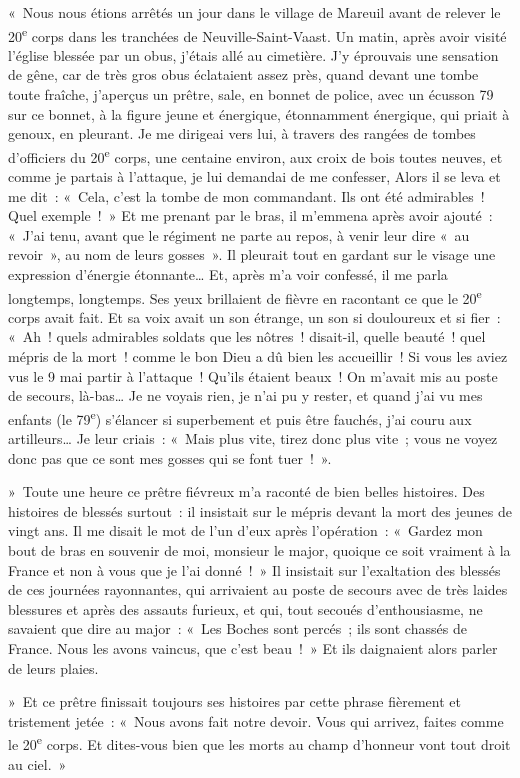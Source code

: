 \documentclass[french,twoside]{book} %
\newenvironment{quoteblock}%
  {\begin{quoting}}
  {\end{quoting}}
\newenvironment{quotebar}{%
    \def\FrameCommand{{\color{rubric!10!}\vrule width 0.5em} \hspace{0.9em}}%
    \def\OuterFrameSep{\itemsep} %
    \MakeFramed {\advance\hsize-\width \FrameRestore}
  }%
  {%
    \endMakeFramed
  }
\renewenvironment{quoteblock}%
  {%
    \savenotes
    \setstretch{0.9}
    \normalfont
    \begin{quotebar}
  }
  {%
    \end{quotebar}
    \spewnotes
  }
\begin{document}
\begin{quoteblock}
\noindent « Nous nous étions arrêtés un jour dans le village de Mareuil avant de relever le 20\textsuperscript{e} corps dans les tranchées de Neuville-Saint-Vaast. Un matin, après avoir visité l’église blessée par un obus, j’étais allé au cimetière. J’y éprouvais une sensation de gêne, car de très gros obus éclataient assez près, quand devant une tombe toute fraîche, j’aperçus un prêtre, sale, en bonnet de police, avec un écusson 79 sur ce bonnet, à la figure jeune et énergique, étonnamment énergique, qui priait à genoux, en pleurant. Je me dirigeai vers lui, à travers des rangées de tombes d’officiers du 20\textsuperscript{e} corps, une centaine environ, aux croix de bois toutes neuves, et comme je partais à l’attaque, je lui demandai de me confesser, Alors il se leva et me dit : « Cela, c’est la tombe de mon commandant. Ils ont été admirables ! Quel exemple ! » Et me prenant par le bras, il m’emmena après avoir ajouté : « J’ai tenu, avant que le régiment ne parte au repos, à venir leur dire « au revoir », au nom de leurs gosses ». Il pleurait tout en gardant sur le visage une expression d’énergie étonnante… Et, après m’a voir confessé, il me parla longtemps, longtemps. Ses yeux brillaient de fièvre en racontant ce que le 20\textsuperscript{e} corps avait fait. Et sa voix avait un son étrange, un son si douloureux et si fier : « Ah ! quels admirables soldats que les nôtres ! disait-il, quelle beauté ! quel mépris de la mort ! comme le bon Dieu a dû bien les accueillir ! Si vous les aviez vus le 9 mai partir à l’attaque ! Qu’ils étaient beaux ! On m’avait mis au poste de secours, là-bas… Je ne voyais rien, je n’ai pu y rester, et quand j’ai vu mes enfants (le 79\textsuperscript{e}) s’élancer si superbement et puis être fauchés, j’ai couru aux artilleurs… Je leur criais : « Mais plus vite, tirez donc plus vite ; vous ne voyez donc pas que ce sont mes gosses qui se font tuer ! ».‌\par
 » Toute une heure ce prêtre fiévreux m’a raconté de bien belles histoires. Des histoires de blessés surtout : il insistait sur le mépris devant la mort des jeunes de vingt ans. Il me disait le mot de l’un d’eux après l’opération : « Gardez mon bout de bras en souvenir de moi, monsieur le major, quoique ce soit vraiment à la France et non à vous que je l’ai donné ! » Il insistait sur l’exaltation des blessés de ces journées rayonnantes, qui arrivaient au poste de secours avec de très laides blessures et après des assauts furieux, et qui, tout secoués d’enthousiasme, ne savaient que dire au major : « Les Boches sont percés ; ils sont chassés de France. Nous les avons vaincus, que c’est beau ! » Et ils daignaient alors parler de leurs plaies.‌\par
 » Et ce prêtre finissait toujours ses histoires par cette phrase fièrement et tristement jetée : « Nous avons fait notre devoir. Vous qui arrivez, faites comme le 20\textsuperscript{e} corps. Et dites-vous bien que les morts au champ d’honneur vont tout droit au ciel. »‌
 \end{quoteblock}
\end{document}

